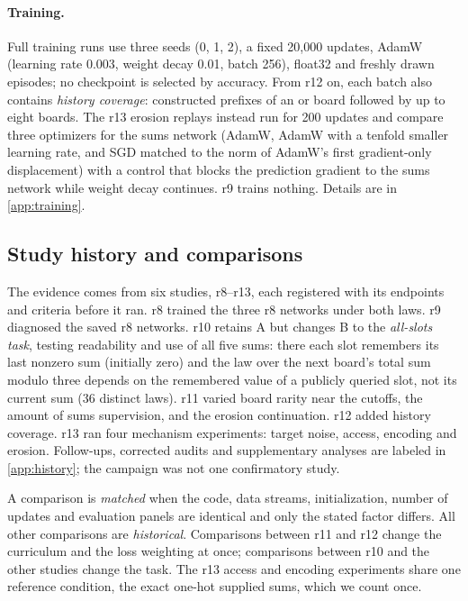 \paragraph{Training.} Full training runs use three seeds (0, 1, 2), a fixed
20,000 updates, AdamW (learning rate 0.003, weight decay 0.01, batch 256),
float32 and freshly drawn episodes; no checkpoint is selected by accuracy.
From r12 on, each batch also contains \emph{history coverage}: constructed
prefixes of an \Lcat{} or \Hcat{} board followed by up to eight \Ncat{}
boards. The r13 erosion replays instead run for 200 updates and compare
three optimizers for the sums network (AdamW, AdamW with a tenfold smaller
learning rate, and SGD matched to the norm of AdamW's first gradient-only displacement) with a control that
blocks the prediction gradient to the sums network while weight decay
continues. r9 trains nothing. Details are in \cref{app:training}.

\subsection{Study history and comparisons}\label{sec:history}

The evidence comes from six studies, r8--r13, each registered with its
endpoints and criteria before it ran. r8 trained the three r8 networks under
both laws. r9 diagnosed the saved r8 networks. r10 retains A but changes B to the
\emph{all-slots task}, testing readability and use of all five sums: there
each slot remembers its last nonzero sum (initially zero) and the law over
the next board's total sum modulo three depends on the remembered value of a
publicly queried slot, not its current sum (36 distinct laws). r11 varied board
rarity near the cutoffs, the amount of sums supervision, and the erosion
continuation. r12 added history coverage. r13 ran four mechanism experiments:
target noise, access, encoding and erosion. Follow-ups, corrected audits and
supplementary analyses are labeled in \cref{app:history}; the campaign was
not one confirmatory study.

A comparison is \emph{matched} when the code, data streams, initialization,
number of updates and evaluation panels are identical and only the stated
factor differs. All other comparisons are \emph{historical}. Comparisons
between r11 and r12 change the curriculum and the loss weighting at once;
comparisons between r10 and the other studies change the task. The r13
access and encoding experiments share one reference condition, the exact
one-hot supplied sums, which we count once.
